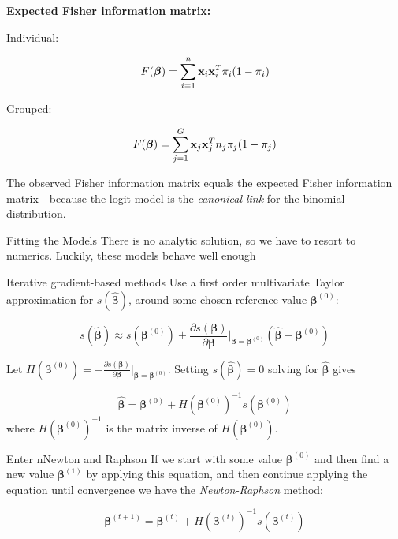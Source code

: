 \documentclass[
  ignorenonframetext,
]{beamer}
\begin{document}
\begin{frame}
\textbf{Expected Fisher information matrix:}

Individual:

\[F(\boldsymbol{\beta})=\sum_{i=1}^n {\bf x}_i {\bf x}_i^T\pi_i (1-\pi_i)\]

Grouped:

\[F(\boldsymbol{\beta})=\sum_{j=1}^G {\bf x}_j {\bf x}_j^T n_j \pi_j (1-\pi_j)\]

The observed Fisher information matrix equals the expected Fisher
information matrix - because the logit model is the \emph{canonical
link} for the binomial distribution.
\end{frame}

\begin{frame}
\begin{block}{Fitting the Models}
\protect\hypertarget{fitting-the-models}{}
There is no analytic solution, so we have to resort to numerics.
Luckily, these models behave well enough
\end{block}
\end{frame}

\begin{frame}
\begin{block}{Iterative gradient-based methods}
\protect\hypertarget{iterative-gradient-based-methods}{}
Use a first order multivariate Taylor approximation for
\(s(\hat{\boldsymbol{\beta}})\), around some chosen reference value
\(\boldsymbol{\beta}^{(0)}\):

\[
s(\hat{\boldsymbol{\beta}})\approx s(\boldsymbol{\beta}^{(0)})+\frac{\partial s(\boldsymbol{\beta})}{\partial \boldsymbol{\beta}}\big\rvert_{\boldsymbol{\beta}=\boldsymbol{\beta}^{(0)}} (\hat{\boldsymbol{\beta}}-\boldsymbol{\beta}^{(0)})
\]

Let
\(H(\boldsymbol{\beta}^{(0)})=-\frac{\partial s(\boldsymbol{\beta})}{\partial \boldsymbol{\beta}}\big\rvert_{\boldsymbol{\beta}=\boldsymbol{\beta}^{(0)}}\).
Setting \(s(\hat{\boldsymbol{\beta}})=0\) solving for
\(\hat{\boldsymbol{\beta}}\) gives

\[
\hat{\boldsymbol{\beta}}=\boldsymbol{\beta}^{(0)} + H(\boldsymbol{\beta}^{(0)})^{-1} s(\boldsymbol{\beta}^{(0)})
\] where \(H(\boldsymbol{\beta}^{(0)})^{-1}\) is the matrix inverse of
\(H(\boldsymbol{\beta}^{(0)})\).
\end{block}
\end{frame}

\begin{frame}
\begin{block}{Enter nNewton and Raphson}
\protect\hypertarget{enter-nnewton-and-raphson}{}
If we start with some value \(\boldsymbol{\beta}^{(0)}\) and then find a
new value \(\boldsymbol{\beta}^{(1)}\) by applying this equation, and
then continue applying the equation until convergence we have the
\emph{Newton-Raphson} method:

\[\boldsymbol{\beta}^{(t+1)}=\boldsymbol{\beta}^{(t)} + H(\boldsymbol{\beta}^{(t)})^{-1} s(\boldsymbol{\beta}^{(t)})\]
\end{block}
\end{frame}
\end{document}
